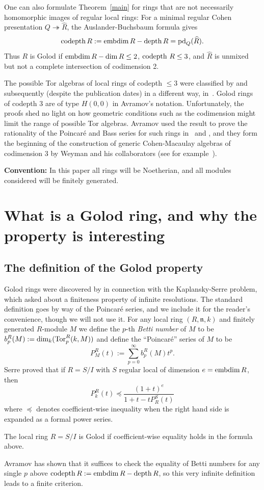 \documentclass[11pt]{amsart}
\def\gn{{\mathfrak n}}
\DeclareMathOperator\codepth{{\rm codepth}}
\DeclareMathOperator\edim{{\rm embdim}}
\begin{document}
One can also formulate Theorem~\ref{main} for rings that are not necessarily homomorphic images of regular local rings:
For a minimal regular Cohen presentation $Q\twoheadrightarrow\widehat R$, the Auslander-Buchsbaum formula gives
\[
\codepth R := \edim R-\depth R = \pd_Q(\widehat R).
\]
Thus $R$ is Golod if $\edim R-\dim R\leq 2$, $\codepth\, R\leq 3$, and $\widehat R$ is unmixed but not a complete intersection of codimension 2.
 
The possible Tor algebras of local rings of codepth $\leq 3$ were classified by \cite{WeymanClassification} and subsequently (despite the publication dates) in a different way, in~\cite{AKMClassification}. Golod rings of codepth 3 are of type $H(0,0)$ in Avramov's notation.  Unfortunately, the proofs shed no light on how geometric conditions such as the codimension might limit the range of possible Tor algebras.  Avramov used the result to prove the rationality 
of the Poincar\'e and Bass series for such rings in~\cite{AKMClassification} and \cite{AvramovCohomological}, and they form the beginning of the construction of generic Cohen-Macaulay algebras of codimension 3 by Weyman and his collaborators (see for example~\cite{GNW}).

  \textbf{Convention:} In this paper all rings will be Noetherian, and all modules considered will be finitely generated.
  
 \section{What is a Golod ring, and why the property is interesting}

\subsection{The definition of the Golod property} Golod rings were discovered by \cite{Golod} in connection with the Kaplansky-Serre problem, which asked about a  finiteness property of infinite resolutions. The standard definition goes by way of the Poincar\'e series, and we include it for the reader's convenience, though we will not use it.
For any local ring $(R,\gn,k)$ and finitely generated $R$-module $M$ we define the
$p$-th \emph{Betti number} of $M$ to be
$b^{R}_{p}(M) := \dim_{k}(\operatorname{Tor}_{p}^{R}(k,M))$
and define the ``Poincar\'e''  series of $M$ to be
$$
P^{R}_{M}(t) := \sum_{p=0}^{\infty}b_{p}^{R}(M)t^{p}.
$$
 Serre proved that if $R = S/I$ with $S$ regular local of dimension $e = \edim R$,
 then
$$
P^{R}_{k}(t)\preceq \frac{(1+t)^{e}}{1+t- tP^{S}_{R}(t)}
$$
where $\preceq$ denotes coefficient-wise inequality when the right hand side is expanded as a formal power series.
\begin{definition}\label{def:Golod}The local ring $R = S/I$ is Golod if coefficient-wise equality holds in the formula above.
\end{definition}
Avramov \cite[Proposition 6.5]{AvramovHopf} has shown that it suffices to check the equality of Betti numbers for
any single $p$ above $\codepth R := \edim R - \depth R$, so this very infinite definition leads to a finite criterion.
\end{document}
